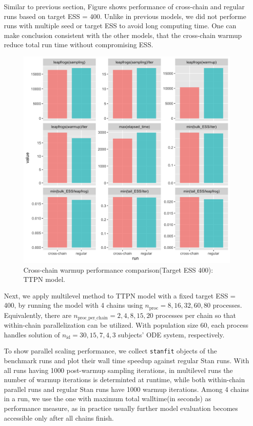 \documentclass[11pt, reqno, oneside]{amsart}
\begin{document}
Similar to previous section, Figure shows performance of cross-chain and
regular runs based on target ESS = 400. Unlike in previous models, we
did not performe runs with multiple seed or target ESS to avoid long
computing time. One can make conclusion consistent with the other
models, that the cross-chain warmup reduce total run time without
compromising ESS.

\begin{figure}[htbp]
\centering
\includegraphics[width=\textwidth]{./figure/ttpn2_ess_400_cross_chain_vs_seq.png}
\caption{Cross-chain warmup performance comparison(Target ESS 400): TTPN model.}
\end{figure}

Next, we apply multilevel method to TTPN model with a fixed target ESS
= 400, by running the model
with 4 chains using \(n_{\text{proc}} = 8, 16, 32, 60, 80\)
processes. Equivalently, there are
\(n_{\text{proc\_per\_chain}} = 2, 4, 8, 15, 20\)
processes per chain so that within-chain parallelization can be utilized.
With population size 60, each process handles solution of
\(n_{\text{id}} = 30, 15, 7, 4, 3\)
subjects' ODE system, respectively.

To show parallel scaling performance, we collect \texttt{stanfit} objects of the benchmark runs
and plot their wall time speedup against regular Stan runs. With all
runs having 1000 post-warmup sampling iterations, in
multilevel runs the number of warmup iterations is determinted at
runtime, while both within-chain parallel runs and regular Stan runs
have 1000 warmup iterations. Among 4 chains in a run, we use the
one with maximum total walltime(in seconds) as performance measure, as
in practice usually further model evaluation becomes accessible only
after all chains finish.
\end{document}
